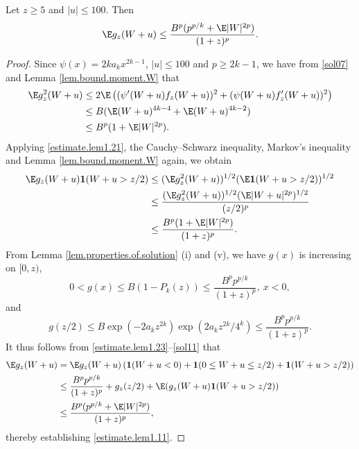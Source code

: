 	
	\begin{lemma} \label{lem.bsg}  
		Let $z\ge 5$ and $|u| \le 100$. Then
		\begin{equation}\label{estimate.lem1.11}
			\E g_{z}(W+u) \le \dfrac{B^p(p^{p/k}+\E|W|^{2p})}{(1+z)^p}.
		\end{equation}
	\end{lemma} 
	
	\begin{proof}
		Since $\psi(x) = 2ka_kx^{2k-1}$, $|u|\le 100$ and $p\ge 2k-1$, we have from \eqref{sol07} and Lemma \ref{lem.bound.moment.W} that
		\begin{equation}\label{estimate.lem1.21}
			\begin{split}
				\E g_{z}^2(W+u) 
				&\le 2\E\left((\psi'(W+u)f_{z}(W+u))^2 + (\psi(W+u)f_{z}'(W+u))^2\right)\\
				&\le B(\E(W+u)^{4k-4} + \E(W+u)^{4k-2}) \\  
				&\le B^{p}(1+ \E|W|^{2p}).
			\end{split} 
		\end{equation}
		Applying \eqref{estimate.lem1.21}, the Cauchy--Schwarz inequality, Markov's inequality and Lemma \ref{lem.bound.moment.W} again, we obtain
		\begin{equation}\label{estimate.lem1.23}
			\begin{split}
				\E g_{z}(W+u)\mathbf{1}(W+u > z/2)
				&\le (\E g_{z}^2(W+u))^{1/2}(\E\mathbf{1}(W+u > z/2))^{1/2}\\
				&\le \frac{(\E g_{z}^2(W+u))^{1/2}(\E|W+u|^{2p})^{1/2}}{(z/2)^p}\\
				&\le \dfrac{B^{p}(1+\E|W|^{2p})}{(1+z)^{p}}.
			\end{split} 
		\end{equation}
		From Lemma \ref{lem.properties.of.solution} (i) and (v), we have $g(x)$ is increasing on $[0,z)$,
		\begin{equation}\label{sol09}
			0 < g(x) \le B(1-P_k(z))\le \frac{B^pp^{p/k}}{(1+z)^{p}},\ x<0,
		\end{equation}
		and 
		\begin{equation}\label{sol11}
			g(z/2)\le B \exp\left(-2a_kz^{2k}\right)\exp\left(2a_kz^{2k}/4^k\right)\le \frac{B^pp^{p/k}}{(1+z)^{p}}.
		\end{equation}
		It thus follows from \eqref{estimate.lem1.23}--\eqref{sol11} that
		\begin{align*}
			\E g_{z}(W+u)&=\E g_{z}(W+u)\left(\mathbf{1}(W+u<0)+\mathbf{1}(0 \le W+u \le z/2)+\mathbf{1}(W+u > z/2)\right)\\
			&\le \frac{B^{p}p^{p/k}}{(1+z)^{p}} + g_{z}(z/2) + \E(g_{z}(W+u)\mathbf{1}(W+u> z/2))\\
			&\le \frac{B^{p}(p^{p/k}+\E|W|^{2p})}{(1+z)^{p}},
		\end{align*}
		thereby establishing \eqref{estimate.lem1.11}.
\end{proof}

